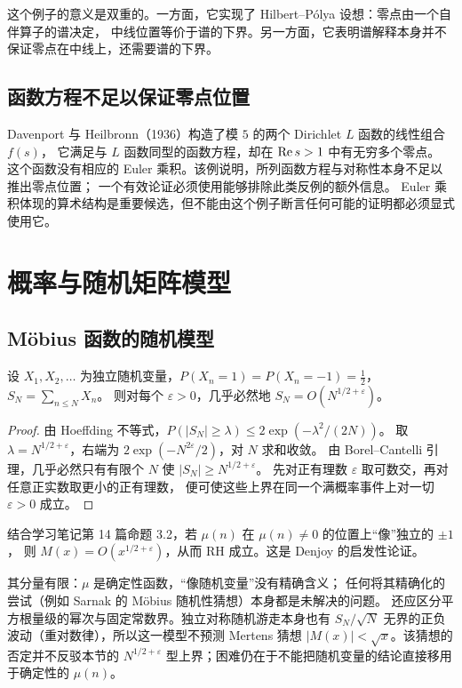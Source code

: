 \documentclass[11pt]{article}
\begin{document}
这个例子的意义是双重的。一方面，它实现了 Hilbert--Pólya 设想：零点由一个自伴算子的谱决定，
中线位置等价于谱的下界。另一方面，它表明谱解释本身并不保证零点在中线上，还需要谱的下界。

\subsection{函数方程不足以保证零点位置}
Davenport 与 Heilbronn（1936）构造了模 $5$ 的两个 Dirichlet $L$ 函数的线性组合 $f(s)$，
它满足与 $L$ 函数同型的函数方程，却在 $\operatorname{Re} s>1$ 中有无穷多个零点。
这个函数没有相应的 Euler 乘积。该例说明，所列函数方程与对称性本身不足以推出零点位置；
一个有效论证必须使用能够排除此类反例的额外信息。
Euler 乘积体现的算术结构是重要候选，但不能由这个例子断言任何可能的证明都必须显式使用它。

\section{概率与随机矩阵模型}
\subsection{Möbius 函数的随机模型}
\begin{proposition}\label{prop:random}
设 $X_1,X_2,\ldots$ 为独立随机变量，$P(X_n=1)=P(X_n=-1)=\tfrac12$，$S_N=\sum_{n\le N}X_n$。
则对每个 $\varepsilon>0$，几乎必然地 $S_N=O(N^{1/2+\varepsilon})$。
\end{proposition}
\begin{proof}
由 Hoeffding 不等式，$P(|S_N|\ge\lambda)\le2\exp(-\lambda^2/(2N))$。
取 $\lambda=N^{1/2+\varepsilon}$，右端为 $2\exp(-N^{2\varepsilon}/2)$，对 $N$ 求和收敛。
由 Borel--Cantelli 引理，几乎必然只有有限个 $N$ 使 $|S_N|\ge N^{1/2+\varepsilon}$。
先对正有理数 $\varepsilon$ 取可数交，再对任意正实数取更小的正有理数，
便可使这些上界在同一个满概率事件上对一切 $\varepsilon>0$ 成立。
\end{proof}
结合学习笔记第 14 篇命题 3.2，若 $\mu(n)$ 在 $\mu(n)\ne0$ 的位置上“像”独立的 $\pm1$，
则 $M(x)=O(x^{1/2+\varepsilon})$，从而 RH 成立。这是 Denjoy 的启发性论证。

其分量有限：$\mu$ 是确定性函数，“像随机变量”没有精确含义；
任何将其精确化的尝试（例如 Sarnak 的 Möbius 随机性猜想）本身都是未解决的问题。
还应区分平方根量级的幂次与固定常数界。独立对称随机游走本身也有
$S_N/\sqrt N$ 无界的正负波动（重对数律），所以这一模型不预测 Mertens 猜想
$|M(x)|<\sqrt x$。该猜想的否定并不反驳本节的
$N^{1/2+\varepsilon}$ 型上界；困难仍在于不能把随机变量的结论直接移用于确定性的 $\mu(n)$。
\end{document}
